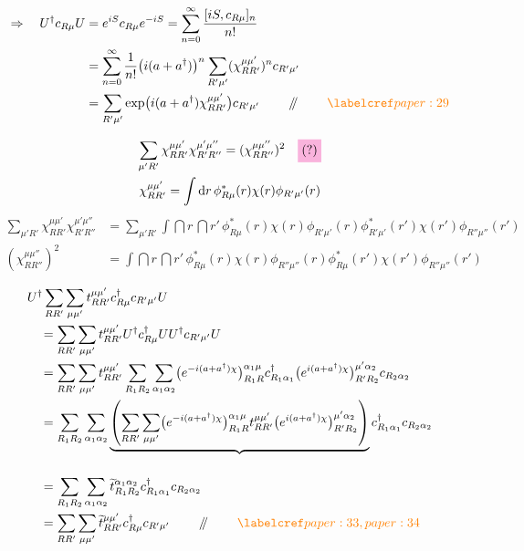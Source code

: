 \begin{align*}
\Rightarrow\quad U^\dagger c_{R\mu}U
 &=e^{iS}c_{R\mu}e^{-iS}=\sum_{n=0}^\infty\frac{[iS,c_{R\mu}]_n}{n!}\\
 &=\sum_{n=0}^\infty\frac{1}{n!}\bigl(i(a+a^\dagger)\bigr)^n
       \sum_{R'\mu'}(\chi_{RR'}^{\mu\mu'})^n c_{R'\mu'}\\
 &=\sum_{R'\mu'}\exp\bigl(i(a+a^\dagger)\chi_{RR'}^{\mu\mu'}\bigr)c_{R'\mu'}
      \qquad\done\qquad \paperref{paper:29}
\end{align*}

\begin{gather*}
\sum_{\mu'R'}\chi_{RR'}^{\mu\mu'}\chi_{R'R''}^{\mu'\mu''}
   =(\chi_{RR''}^{\mu\mu''})^2\quad\text{\highlight{magenta}{(?)}}\\
\chi_{RR'}^{\mu\mu'}
   =\int \dint r\,\phi^*_{R\mu}(r)\chi(r)\phi_{R'\mu'}(r)
\end{gather*}
\begin{align*}
\sum_{\mu'R'}\chi_{RR'}^{\mu\mu'}\chi_{R'R''}^{\mu'\mu''}
 &=\sum_{\mu'R'}\int \dint r\,\dint r'\,
   \phi^*_{R\mu}(r)\chi(r)\phi_{R'\mu'}(r)
   \phi^*_{R'\mu'}(r')\chi(r')\phi_{R''\mu''}(r')\\
(\chi_{RR''}^{\mu\mu''})^2
 &=\int \dint r\,\dint r'\,
   \phi^*_{R\mu}(r)\chi(r)\phi_{R''\mu''}(r)
   \phi^*_{R\mu}(r')\chi(r')\phi_{R''\mu''}(r')
\end{align*}

\begin{align*}
&U^\dagger\sum_{RR'}\sum_{\mu\mu'}t_{RR'}^{\mu\mu'}
      c^\dagger_{R\mu}c_{R'\mu'}U\\
&\quad=\sum_{RR'}\sum_{\mu\mu'}t_{RR'}^{\mu\mu'}
      U^\dagger c^\dagger_{R\mu}U U^\dagger c_{R'\mu'}U\\
&\quad=\sum_{RR'}\sum_{\mu\mu'}t_{RR'}^{\mu\mu'}
   \sum_{R_1R_2}\sum_{\alpha_1\alpha_2}
   \bigl(e^{-i(a+a^\dagger)\chi}\bigr)_{R_1R}^{\alpha_1\mu}
      c^\dagger_{R_1\alpha_1}
   \bigl(e^{i(a+a^\dagger)\chi}\bigr)_{R'R_2}^{\mu'\alpha_2}
      c_{R_2\alpha_2}\\
&\quad=\sum_{R_1R_2}\sum_{\alpha_1\alpha_2}
   \underbrace{\left(
     \sum_{RR'}\sum_{\mu\mu'}
       \bigl(e^{-i(a+a^\dagger)\chi}\bigr)_{R_1R}^{\alpha_1\mu}
       t_{RR'}^{\mu\mu'}
       \bigl(e^{i(a+a^\dagger)\chi}\bigr)_{R'R_2}^{\mu'\alpha_2}
      \right)}_{\vphantom{\widetilde t_{R_1R_2}^{\alpha_1\alpha_2}}}
      c^\dagger_{R_1\alpha_1}c_{R_2\alpha_2}\\
&\quad=\sum_{R_1R_2}\sum_{\alpha_1\alpha_2}
     \widetilde t_{R_1R_2}^{\alpha_1\alpha_2}
        c^\dagger_{R_1\alpha_1}c_{R_2\alpha_2}\\
&\quad=\sum_{RR'}\sum_{\mu\mu'}
     \widetilde t_{RR'}^{\mu\mu'}c^\dagger_{R\mu}c_{R'\mu'}
      \qquad\done\qquad\paperref{paper:33,paper:34}
\end{align*}

